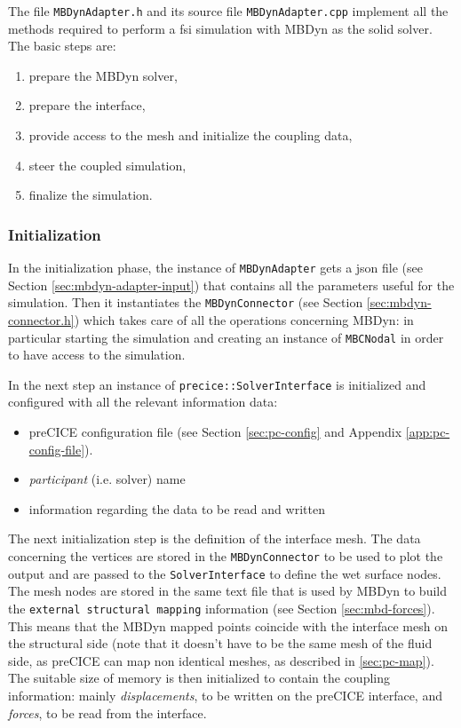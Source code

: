The file \texttt{MBDynAdapter.h} and its source file \texttt{MBDynAdapter.cpp} implement all the methods required to perform a \acrshort{fsi} simulation with MBDyn as the solid solver. The basic steps are:

\begin{enumerate}
	\item prepare the MBDyn solver,
	\item prepare the interface,
	\item provide access to the mesh and initialize the coupling data,
	\item steer the coupled simulation,
	\item finalize the simulation.
\end{enumerate}

\subsubsection{Initialization}

In the initialization phase, the instance of \texttt{MBDynAdapter} gets a \acrfull{json} file (see Section \ref{sec:mbdyn-adapter-input}) that contains all the parameters useful for the simulation.
Then it instantiates the \texttt{MBDynConnector} (see Section \ref{sec:mbdyn-connector.h}) which takes care of all the operations concerning MBDyn: in particular starting the simulation and creating an instance of \texttt{MBCNodal} in order to have access to the simulation.

In the next step an instance of \texttt{precice::SolverInterface} is initialized and configured with all the relevant information data:

\begin{itemize}
	\item preCICE configuration file (see Section \ref{sec:pc-config} and Appendix \ref{app:pc-config-file}).
	\item \textit{participant} (i.e. solver) name
	\item information regarding the data to be read and written
\end{itemize} 

The next initialization step is the definition of the interface mesh. The data concerning the vertices are stored in the \texttt{MBDynConnector} to be used to plot the output and are passed to the \texttt{SolverInterface} to define the wet surface nodes. The mesh nodes are stored in the same text file that is used by MBDyn to build the \texttt{external structural mapping} information (see Section \ref{sec:mbd-forces}). This means that the MBDyn mapped points coincide with the interface mesh on the structural side (note that it doesn't have to be the same mesh of the fluid side, as preCICE can map non identical meshes, as described in \ref{sec:pc-map}). The suitable size of memory is then initialized to contain the coupling information: mainly \textit{displacements}, to be written on the preCICE interface, and \textit{forces}, to be read from the interface.


